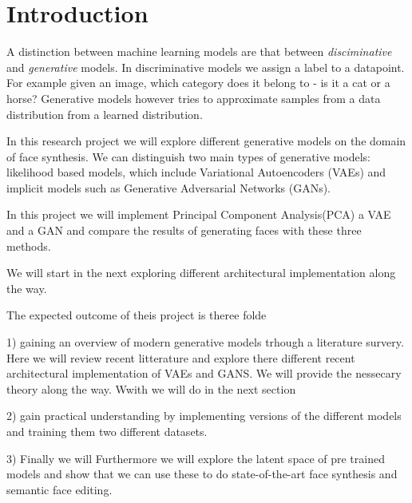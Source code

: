 \section{Introduction}


A distinction between machine learning models are that between \emph{disciminative} and \emph{generative} models. In discriminative models we assign a label to a datapoint. For example given an image, which category does it belong to - is it a cat or a horse? Generative models however tries to approximate samples from a data distribution from a learned distribution.

In this research project we will explore different generative models on the domain of face synthesis. We can distinguish two main types of generative models: likelihood based models, which include Variational Autoencoders (VAEs) and implicit models such as Generative Adversarial Networks (GANs)\cite{vqvae2}.

In this project we will implement Principal Component Analysis(PCA) a VAE and a GAN and compare the results of generating faces with these three methods.

We will start in the next
exploring different architectural implementation along the way.

The expected outcome of theis project is theree folde

1) gaining an overview of modern generative models trhough a literature survery. Here we will review recent litterature and explore there different recent  architectural implementation of VAEs and GANS. We will provide the nessecary theory along the way. Wwith we will do in the next section

2) gain practical understanding by implementing versions of the different models and training them two different datasets.

3) Finally we will Furthermore we will explore the latent space of pre trained models and show that we can use these to do state-of-the-art face synthesis and semantic face editing.

